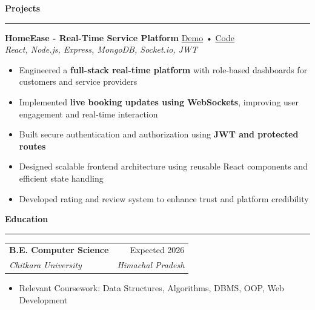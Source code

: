 \documentclass[10pt, letterpaper]{article}
\makeatletter
\newcommand{\resumesection}[1]{
    \vspace{6pt}
    {\large \textbf{\textcolor{accent}{#1}}}
    \vspace{1pt}\hrule
    \vspace{4pt}
}
\newcommand{\experience}[4]{
    \begin{tabularx}{\textwidth}{@{} X r @{}}
        \textbf{#1} & #2 \\
        \textit{#3} & \textit{#4} \\
    \end{tabularx}
}
\newcommand{\project}[4]{
    \vspace{2pt}
    \textbf{#1} \hfill \href{#3}{\faIcon{globe} Demo} • \href{#4}{\faIcon{github} Code} \\
    \textit{\small #2}
    \vspace{1pt}
}
\makeatother
\begin{document}
\resumesection{Projects}

\project{HomeEase - Real-Time Service Platform}{React, Node.js, Express, MongoDB, Socket.io, JWT}{https://homeease-oa77.onrender.com/}{https://github.com/SharadJ19/homeease}
\begin{itemize}
    \item Engineered a \textbf{full-stack real-time platform} with role-based dashboards for customers and service providers
    
    \item Implemented \textbf{live booking updates using WebSockets}, improving user engagement and real-time interaction
    
    \item Built secure authentication and authorization using \textbf{JWT and protected routes}
    
    \item Designed scalable frontend architecture using reusable React components and efficient state handling
    
    \item Developed rating and review system to enhance trust and platform credibility
\end{itemize}

\resumesection{Education}
\experience{B.E. Computer Science}{Expected 2026}{Chitkara University}{Himachal Pradesh}
\vspace{-6pt}
\begin{itemize}
    \item Relevant Coursework: Data Structures, Algorithms, DBMS, OOP, Web Development
\end{itemize}
\end{document}
